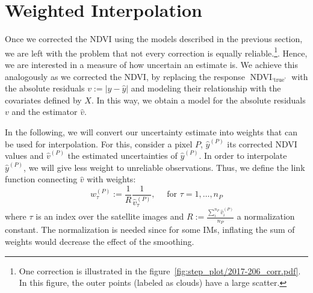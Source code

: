 \section{Weighted Interpolation}{
    \label{sec:corr_uncertainty}
    Once we corrected the NDVI using the models described in the previous section, we are left with the problem that not every correction is equally reliable.\footnote{One correction is illustrated in the figure~\ref{fig:step_plot/2017-206_corr.pdf}. In this figure, the outer points (labeled as clouds) have a large scatter.}. Hence, we are interested in a measure of how uncertain an estimate is. 
    We achieve this analogously as we corrected the NDVI, by replacing the response $\operatorname{NDVI}_\text{`true'}$ with the absolute residuals $v := \left|y -\hat y\right|$ and modeling their relationship with the covariates defined by $X$.  In this way, we obtain a model for the absolute residuals $v$ and the estimator $\hat v$. 
    
    \label{sec:corr_link}
    In the following, we will convert our uncertainty estimate into weights that can be used for interpolation. For this, consider a pixel $P$, $\hat y^{(P)}$ its corrected NDVI values and $\hat v^{(P)}$ the estimated uncertainties of $\hat y^{(P)}$. In order to interpolate $\hat y^{(P)}$, we will give less weight to unreliable observations. Thus, we define the link function connecting $\hat v$ with weights: 
    \begin{equation}
        \label{eq:corr_link}
        w^{(P)}_\tau:=\frac{1}{R} \frac{1}{\hat v^{(P)}_\tau}, 
        \quad \text{ for } \tau=1,\dots, n_P
    \end{equation}  
    where $\tau$ is an index over the satellite images and $R:=\frac{\sum_i^{n_P}\hat v^{(P)}_i}{n_P}$ a normalization constant. The normalization is needed since for some {{IM}}s, inflating the sum of weights would decrease the effect of the smoothing. 
}


